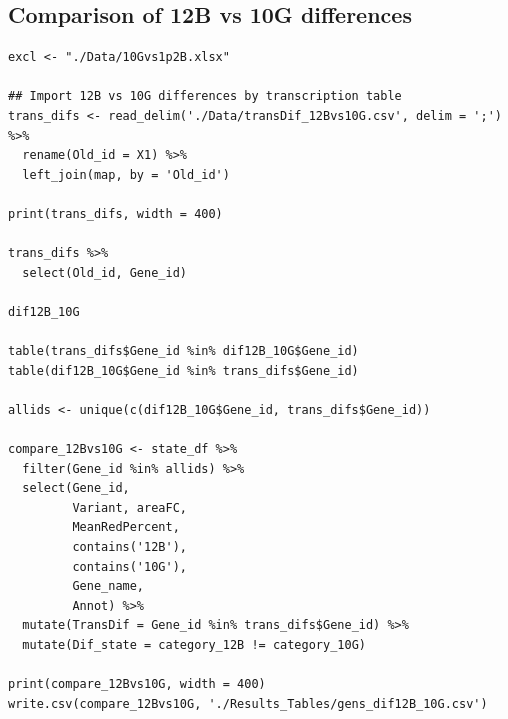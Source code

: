 \documentclass[11pt]{article}
\begin{document}
\subsection{Comparison of 12B vs 10G differences}
\label{sec:orgc088722}
\begin{verbatim}
excl <- "./Data/10Gvs1p2B.xlsx"

## Import 12B vs 10G differences by transcription table
trans_difs <- read_delim('./Data/transDif_12Bvs10G.csv', delim = ';') %>%
  rename(Old_id = X1) %>%
  left_join(map, by = 'Old_id')

print(trans_difs, width = 400)

trans_difs %>%
  select(Old_id, Gene_id)

dif12B_10G

table(trans_difs$Gene_id %in% dif12B_10G$Gene_id)
table(dif12B_10G$Gene_id %in% trans_difs$Gene_id)

allids <- unique(c(dif12B_10G$Gene_id, trans_difs$Gene_id))

compare_12Bvs10G <- state_df %>%
  filter(Gene_id %in% allids) %>%
  select(Gene_id,
         Variant, areaFC,
         MeanRedPercent,
         contains('12B'),
         contains('10G'),
         Gene_name,
         Annot) %>%
  mutate(TransDif = Gene_id %in% trans_difs$Gene_id) %>%
  mutate(Dif_state = category_12B != category_10G)

print(compare_12Bvs10G, width = 400)
write.csv(compare_12Bvs10G, './Results_Tables/gens_dif12B_10G.csv')
\end{verbatim}
\end{document}
